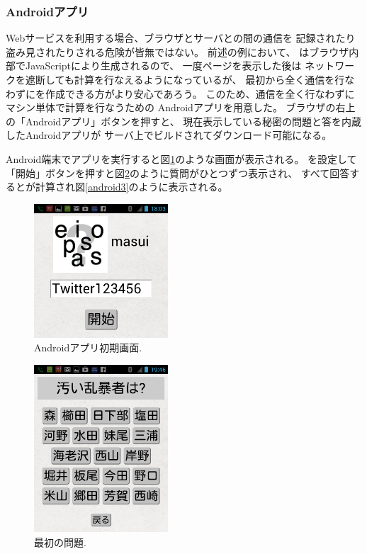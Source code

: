 \documentclass[twoside]{wiss}
\begin{document}
\subsubsection{Androidアプリ}

Webサービスを利用する場合、ブラウザとサーバとの間の通信を
記録されたり盗み見されたりされる危険が皆無ではない。
前述の例において、
{\PW}はブラウザ内部でJavaScriptにより生成されるので、
一度ページを表示した後は
ネットワークを遮断しても{\PW}計算を行なえるようになっているが、
最初から全く通信を行なわずに{\PW}を作成できる方がより安心であろう。
このため、通信を全く行なわずにマシン単体で{\PW}計算を行なうための
Androidアプリを用意した。
ブラウザの右上の「Androidアプリ」ボタンを押すと、
現在表示している秘密の問題と答を内蔵したAndroidアプリが
サーバ上でビルドされてダウンロード可能になる。

Android端末でアプリを実行すると図\ref{android1}のような画面が表示される。
{\SS}を設定して「開始」ボタンを押すと図\ref{android2}のように質問がひとつずつ表示され、
すべて回答すると{\PW}が計算され図\ref{android3}のように表示される。

\begin{figure}[H]
\centerline{\includegraphics[width=50mm,bb=0 0 720 720]{figures/android1crop.png}}
\caption{Androidアプリ初期画面.}
\label{android1}
\end{figure}

\begin{figure}[H]
\centerline{\includegraphics[width=50mm,bb=0 0 720 900]{figures/android2crop.png}}
\caption{最初の問題.}
\label{android2}
\end{figure}
\end{document}
